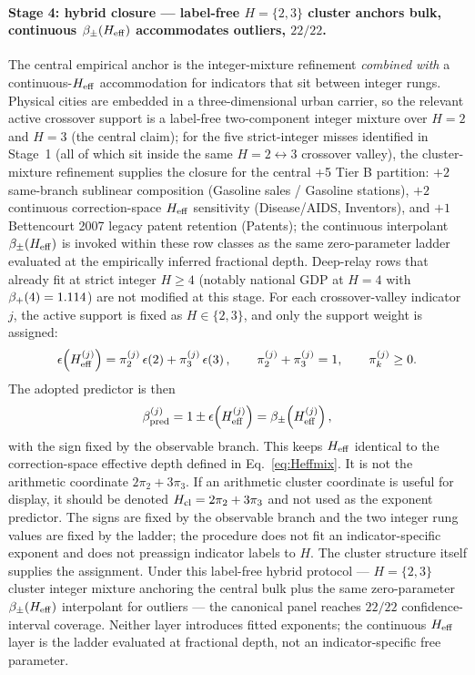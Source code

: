 \paragraph{Stage 4: hybrid closure --- label-free \(H{=}\{2,3\}\) cluster anchors bulk, continuous \(\beta_{\pm}(H_{\mathrm{eff}})\) accommodates outliers, \(22/22\).}
The central empirical anchor is the integer-mixture refinement \emph{combined with} a continuous-\(H_{\mathrm{eff}}\) accommodation for indicators that sit between integer rungs. Physical
cities are embedded in a three-dimensional urban carrier, so the relevant
active crossover support is a label-free two-component integer mixture over
\(H=2\) and \(H=3\) (the central claim); for the five strict-integer
misses identified in Stage~1 (all of which sit inside the same
\(H{=}2{\leftrightarrow}3\) crossover valley), the cluster-mixture refinement supplies the closure for the central +5 Tier B partition: $+2$ same-branch sublinear composition (Gasoline sales / Gasoline stations), $+2$ continuous correction-space \(H_{\mathrm{eff}}\) sensitivity (Disease/AIDS, Inventors), and $+1$ Bettencourt 2007 legacy patent retention (Patents); the continuous interpolant \(\beta_{\pm}(H_{\mathrm{eff}})\) is invoked within these row classes as the same zero-parameter ladder evaluated at the empirically inferred fractional depth. Deep-relay rows that already
fit at strict integer \(H{\geq}4\) (notably national GDP at \(H{=}4\) with
\(\beta_+\!\left(4\right)=1.114\)) are not modified at this stage. For each crossover-valley indicator \(j\), the active support is fixed as \(H\in\{2,3\}\), and only the support weight is assigned:
\[
\epsilon\!\left(H_{\mathrm{eff}}^{(j)}\right)=
\pi_2^{(j)}\,\epsilon\!\left(2\right)+\pi_3^{(j)}\,\epsilon\!\left(3\right),
\qquad
\pi_2^{(j)}+\pi_3^{(j)}=1,\qquad
\pi_k^{(j)}\ge 0.
\]
The adopted predictor is then
\[
\beta_{\mathrm{pred}}^{(j)}
=
1\pm \epsilon\!\left(H_{\mathrm{eff}}^{(j)}\right)
=
\beta_{\pm}\!\left(H_{\mathrm{eff}}^{(j)}\right),
\]
with the sign fixed by the observable branch. This keeps \(H_{\mathrm{eff}}\) identical to the correction-space effective depth defined in Eq.~\eqref{eq:Heffmix}. It is not the arithmetic coordinate \(2\pi_2+3\pi_3\). If an arithmetic cluster coordinate is useful for display, it should be denoted \(H_{\rm cl}=2\pi_2+3\pi_3\) and not used as the exponent predictor.
The signs are fixed by the observable branch and the two integer rung values
are fixed by the ladder; the procedure does not fit an indicator-specific
exponent and does not preassign indicator labels to \(H\). The cluster
structure itself supplies the assignment. Under this label-free hybrid
protocol --- \(H{=}\{2,3\}\) cluster integer mixture anchoring the central bulk plus
the same zero-parameter \(\beta_{\pm}(H_{\mathrm{eff}})\) interpolant for outliers ---
the canonical panel reaches \(22/22\) confidence-interval coverage. Neither
layer introduces fitted exponents; the continuous \(H_{\mathrm{eff}}\) layer is the
ladder evaluated at fractional depth, not an indicator-specific free parameter.

